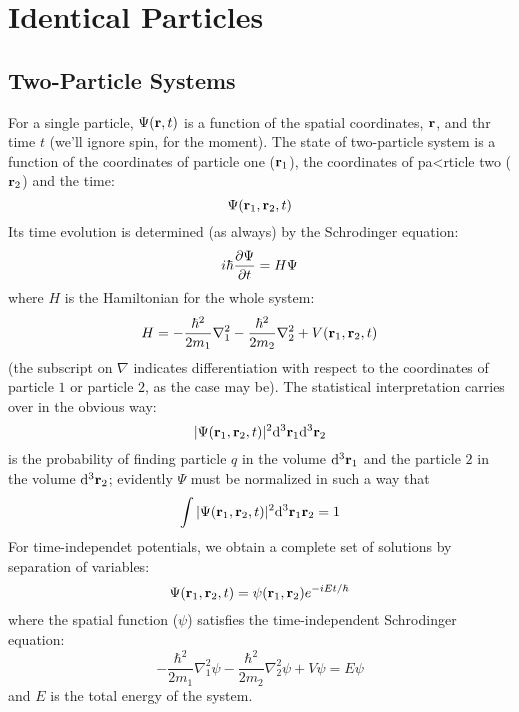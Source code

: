 \chapter{Identical Particles}
\section{Two-Particle Systems}
For a single particle, $\Psi(\vb{r},t)$ is a function of the spatial coordinates, $\vb{r}$, and thr time $t$ (we'll ignore spin, for the moment). The state of two-particle system is a function of the coordinates of particle one ($\vb{r}_1$), the coordinates of pa<rticle two ($\vb{r}_2$) and the time:
\begin{equation}\label{5.1}
	\Psi(\vb{r}_1,\vb{r}_2,t)
\end{equation}
Its time evolution is determined (as always) by the Schrodinger equation:
\begin{equation}\label{5.2}
	i\hbar\pdv{\Psi}{t}=H\Psi
\end{equation}
where $H$ is the Hamiltonian for the whole system:
\begin{equation}\label{5.3}
	H=-\frac{\hbar^2}{2m_1}\nabla_1^2-\frac{\hbar^2}{2m_2}\nabla_2^2+V(\vb{r}_1,\vb{r}_2,t)
\end{equation}
(the subscript on $\nabla$ indicates differentiation with respect to the coordinates of particle $1$ or particle $2$, as the case may be). The statistical interpretation carries over in the obvious way:
\begin{equation}\label{5.4}
	|\Psi(\vb{r}_1,\vb{r}_2,t)|^2\dd^3\vb{r}_1\dd^3\vb{r}_2
\end{equation}
is the probability of finding particle $q$ in the volume $\dd^3\vb{r}_1$ and the particle $2$ in the volume $\dd^3\vb{r}_2$; evidently $\Psi$ must be normalized in such a way that
\begin{equation}\label{5.5}
	\int|\Psi(\vb{r}_1,\vb{r}_2,t)|^2\dd^3\vb{r}_1\vb{r}_2=1
\end{equation}
For time-independet potentials, we obtain a complete set of solutions by separation of variables:
\begin{equation}\label{5.6}
	\Psi(\vb{r}_1,\vb{r}_2,t)=\psi(\vb{r}_1,\vb{r}_2)e^{-iEt/\hbar}
\end{equation}
where the spatial function ($\psi$) satisfies the time-independent Schrodinger equation:
\begin{equation}\label{5.7}
	-\frac{\hbar^2}{2m_1}\nabla_1^2\psi - \frac{\hbar^2}{2m_2}\nabla_2^2\psi+V\psi=E\psi
\end{equation}
and $E$ is the total energy of the system.

